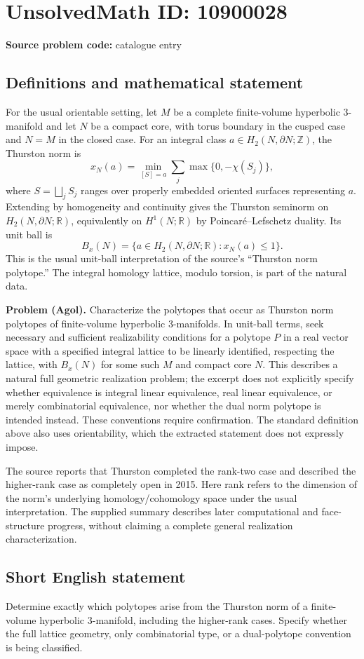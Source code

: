 \documentclass[11pt]{article}
\newcommand{\Z}{\mathbb{Z}}
\newcommand{\R}{\mathbb{R}}
\begin{document}
\section*{UnsolvedMath ID: 10900028}
\textbf{Source problem code:} catalogue entry
\subsection{Definitions and mathematical statement}
For the usual orientable setting, let $M$ be a complete finite-volume hyperbolic $3$-manifold and let $N$ be a compact core, with torus boundary in the cusped case and $N=M$ in the closed case. For an integral class $a\in H_2(N,\partial N;\Z)$, the Thurston norm is
\[
 x_N(a)=\min_{[S]=a}\sum_j\max\{0,-\chi(S_j)\},
\]
where $S=\bigsqcup_jS_j$ ranges over properly embedded oriented surfaces representing $a$. Extending by homogeneity and continuity gives the Thurston seminorm on $H_2(N,\partial N;\R)$, equivalently on $H^1(N;\R)$ by Poincar\'e--Lefschetz duality. Its unit ball is
\[
 B_x(N)=\{a\in H_2(N,\partial N;\R):x_N(a)\le1\}.
\]
This is the usual unit-ball interpretation of the source's ``Thurston norm polytope.'' The integral homology lattice, modulo torsion, is part of the natural data.

\textbf{Problem (Agol).} Characterize the polytopes that occur as Thurston norm polytopes of finite-volume hyperbolic $3$-manifolds. In unit-ball terms, seek necessary and sufficient realizability conditions for a polytope $P$ in a real vector space with a specified integral lattice to be linearly identified, respecting the lattice, with $B_x(N)$ for some such $M$ and compact core $N$. This describes a natural full geometric realization problem; the excerpt does not explicitly specify whether equivalence is integral linear equivalence, real linear equivalence, or merely combinatorial equivalence, nor whether the dual norm polytope is intended instead. These conventions require confirmation. The standard definition above also uses orientability, which the extracted statement does not expressly impose.

The source reports that Thurston completed the rank-two case and described the higher-rank case as completely open in 2015. Here rank refers to the dimension of the norm's underlying homology/cohomology space under the usual interpretation. The supplied summary describes later computational and face-structure progress, without claiming a complete general realization characterization.
\subsection{Short English statement}
Determine exactly which polytopes arise from the Thurston norm of a finite-volume hyperbolic $3$-manifold, including the higher-rank cases. Specify whether the full lattice geometry, only combinatorial type, or a dual-polytope convention is being classified.
\end{document}

